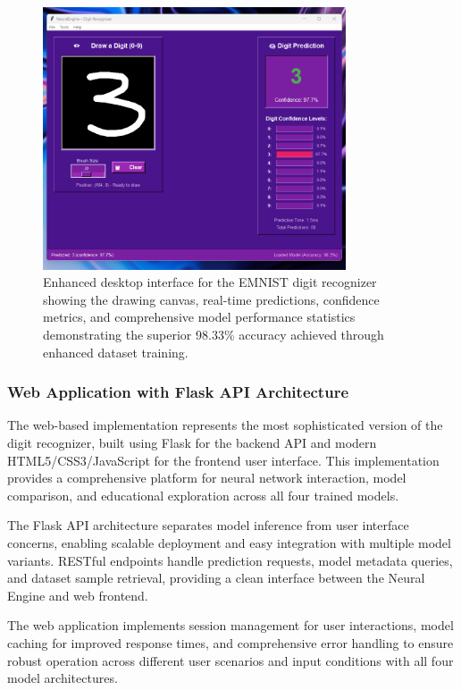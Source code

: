 \documentclass[11pt,a4paper]{report}
\begin{document}
\begin{figure}[H]
\centering
\includegraphics[width=0.8\textwidth]{digit_recognizer_desktop_interface.png}
\caption{Enhanced desktop interface for the EMNIST digit recognizer showing the drawing canvas, real-time predictions, confidence metrics, and comprehensive model performance statistics demonstrating the superior 98.33\% accuracy achieved through enhanced dataset training.}
\label{fig:digit_desktop}
\end{figure}

\subsubsection{Web Application with Flask API Architecture}

The web-based implementation represents the most sophisticated version of the digit recognizer, built using Flask for the backend API and modern HTML5/CSS3/JavaScript for the frontend user interface. This implementation provides a comprehensive platform for neural network interaction, model comparison, and educational exploration across all four trained models.

The Flask API architecture separates model inference from user interface concerns, enabling scalable deployment and easy integration with multiple model variants. RESTful endpoints handle prediction requests, model metadata queries, and dataset sample retrieval, providing a clean interface between the Neural Engine and web frontend.

The web application implements session management for user interactions, model caching for improved response times, and comprehensive error handling to ensure robust operation across different user scenarios and input conditions with all four model architectures.
\end{document}
